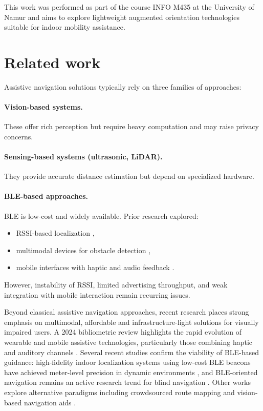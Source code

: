 \documentclass[sigconf]{acmart}
\begin{document}
This work was performed as part of the course INFO M435 at the University of Namur and aims to explore lightweight augmented orientation technologies suitable for indoor mobility assistance.

\section{Related work}

Assistive navigation solutions typically rely on three families of approaches:

\paragraph{Vision-based systems.}
These offer rich perception but require heavy computation and may raise privacy concerns.

\paragraph{Sensing-based systems (ultrasonic, LiDAR).}
They provide accurate distance estimation but depend on specialized hardware.

\paragraph{BLE-based approaches.}
BLE is low-cost and widely available. Prior research explored:
\begin{itemize}
    \item RSSI-based localization \cite{kammounNavigationSpacePerception2012},
    \item multimodal devices for obstacle detection \cite{mekhalfiRecoveringSightBlind2016},
    \item mobile interfaces with haptic and audio feedback \cite{sarfrazMultimodalAssistiveSystem2017}.
\end{itemize}

However, instability of RSSI, limited advertising throughput, and weak integration with mobile interaction remain recurring issues.

Beyond classical assistive navigation approaches, recent research places strong emphasis on multimodal, affordable and infrastructure-light solutions for visually impaired users. A 2024 bibliometric review highlights the rapid evolution of wearable and mobile assistive technologies, particularly those combining haptic and auditory channels \cite{Zhang2024}. Several recent studies confirm the viability of BLE-based guidance: high-fidelity indoor localization systems using low-cost BLE beacons have achieved meter-level precision in dynamic environments \cite{Mustafa2021}, and BLE-oriented navigation remains an active research trend for blind navigation \cite{SmartBLE2025}. Other works explore alternative paradigms including crowdsourced route mapping \cite{CrowdNav2022} and vision-based navigation aids \cite{liVisionBasedMobileIndoor2019}.
\end{document}
